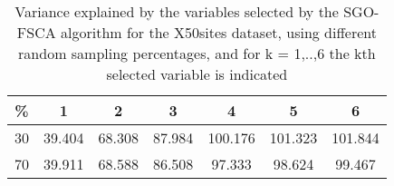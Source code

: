 \begin{table}
	\begin{center}
		\begin{tabular}{c c c c c c c}
			\% & 1 & 2 & 3 & 4 & 5 & 6 \\
			\hline
			30 & 39.404 & 68.308 & 87.984 & 100.176 & 101.323 & 101.844 \\
			70 & 39.911 & 68.588 & 86.508 & 97.333 & 98.624 & 99.467 \\
		\end{tabular}
	\end{center}
	\caption{Variance explained by the variables selected by the SGO-FSCA algorithm for the X50sites dataset, using different random sampling percentages, and for k = 1,..,6 the kth selected variable is indicated}
\end{table}